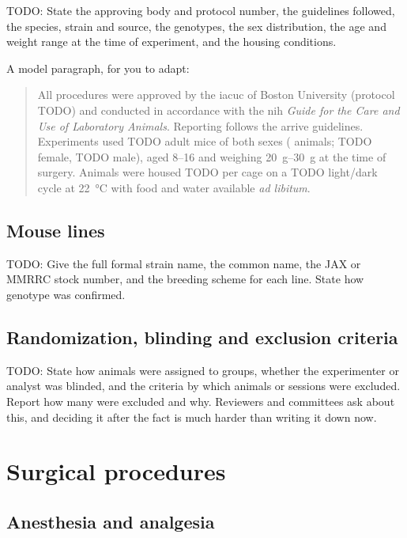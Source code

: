 		TODO: State the approving body and protocol number, the guidelines
		followed, the species, strain and source, the genotypes, the sex
		distribution, the age and weight range at the time of experiment, and
		the housing conditions.

		A model paragraph, for you to adapt:

		\begin{quote}
			All procedures were approved by the \acrshort{iacuc} of Boston
			University (protocol TODO) and conducted in accordance with the
			\acrshort{nih} \emph{Guide for the Care and Use of Laboratory
			Animals}. Reporting follows the \acrshort{arrive} guidelines.
			Experiments used TODO adult mice of both sexes
			( animals; TODO female, TODO male), aged
			\SIrange{8}{16}{\week} and weighing
			\SIrange{20}{30}{\gram} at the time of surgery. Animals were
			housed TODO per cage on a TODO light/dark cycle at
			\SI{22}{\celsius} with food and water available \emph{ad libitum}.
		\end{quote}

		\subsection{Mouse lines}\label{section:methods:animals:lines}

			TODO: Give the full formal strain name, the common name, the JAX or
			MMRRC stock number, and the breeding scheme for each line. State
			how genotype was confirmed.

		\subsection{Randomization, blinding and exclusion criteria}

			TODO: State how animals were assigned to groups, whether the
			experimenter or analyst was blinded, and the criteria by which
			animals or sessions were excluded. Report how many were excluded
			and why. Reviewers and committees ask about this, and deciding it
			after the fact is much harder than writing it down now.

	\section{Surgical procedures}\label{section:methods:surgery}

		\subsection{Anesthesia and analgesia}

